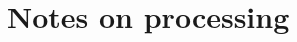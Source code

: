 \begin{description}
\begin{steps}
% 
% 
% 
% 
% 
\end{steps}


\end{description}


\section{Notes on processing\label{sec:ehf:notes}}


